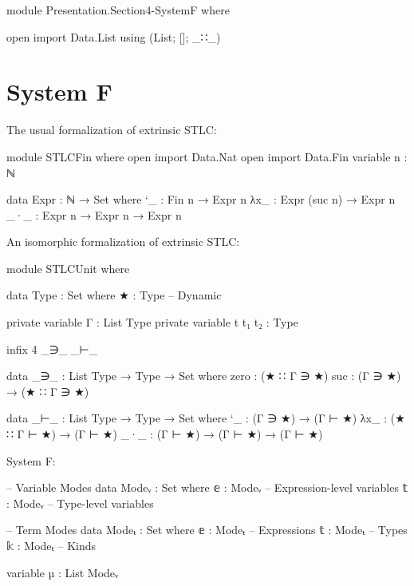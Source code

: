 \begin{code}[hide]
module Presentation.Section4-SystemF where

open import Data.List using (List; []; _∷_)
\end{code}

\section{System F}

\begin{frame}
The usual formalization of extrinsic STLC:

\begin{code}[hide]
module STLCFin where
  open import Data.Nat
  open import Data.Fin
  variable n : ℕ
\end{code}
\begin{code}
  data Expr : ℕ → Set where
    `_   : Fin n → Expr n
    λx_  : Expr (suc n) → Expr n
    _·_  : Expr n → Expr n → Expr n
\end{code}
\end{frame}

\begin{frame}
An isomorphic formalization of extrinsic STLC:
\begin{code}[hide]
module STLCUnit where
\end{code}
\begin{code}
  data Type : Set where
    ★ : Type -- Dynamic
\end{code}
\begin{code}[hide]
  private variable Γ : List Type
  private variable t t₁ t₂ : Type

  infix  4  _∋_  _⊢_

  data _∋_ : List Type → Type → Set where
    zero  : (★ ∷ Γ ∋ ★)
    suc   : (Γ ∋ ★) → (★ ∷ Γ ∋ ★)
\end{code}
\begin{code}
  data _⊢_ : List Type → Type → Set where
    `_   : (Γ ∋ ★) → (Γ ⊢ ★)
    λx_  : (★ ∷ Γ ⊢ ★) → (Γ ⊢ ★)
    _·_  : (Γ ⊢ ★) → (Γ ⊢ ★) → (Γ ⊢ ★)
\end{code}
\end{frame}

\begin{frame}
System F:

\begin{code}
-- Variable Modes
data Modeᵥ : Set where
  𝕖 : Modeᵥ  -- Expression-level variables
  𝕥 : Modeᵥ  -- Type-level variables

-- Term Modes
data Modeₜ : Set where
  𝕖 : Modeₜ  -- Expressions
  𝕥 : Modeₜ  -- Types
  𝕜 : Modeₜ  -- Kinds

variable µ : List Modeᵥ
\end{code}
\end{frame}

